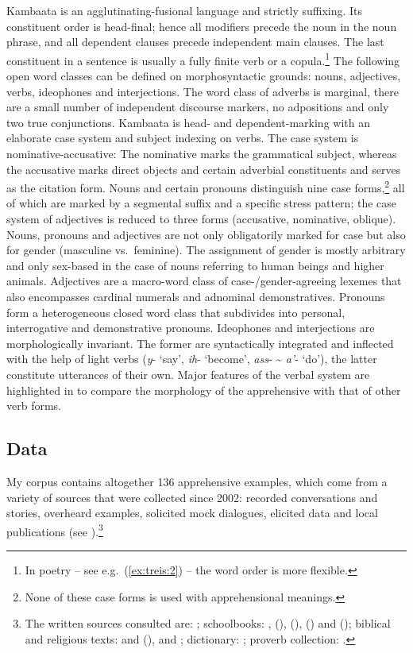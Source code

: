 \documentclass[output=paper,colorlinks,citecolor=brown,
]{langsci/langscibook}
\begin{document}
Kambaata is an agglutinating-fusional language and strictly suffixing. Its constituent order is head-final; hence all modifiers precede the noun in the noun phrase, and all dependent clauses precede independent main clauses. The last constituent in a sentence is usually a fully finite verb or a copula.\footnote{In poetry -- see  e.g.\ (\ref{ex:treis:2}) -- the word order is more flexible.} The following open word classes can be defined on morphosyntactic grounds: nouns, adjectives, verbs, ideophones and interjections. The word class of adverbs is marginal, there are a small number of independent discourse markers, no adpositions and only two true conjunctions. Kambaata is head- and dependent-marking with an elaborate case system and subject indexing on verbs. The case system is nominative-accusative: The nominative marks the grammatical subject, whereas the accusative marks direct objects and certain adverbial constituents and serves as the citation form. Nouns and certain pronouns distinguish nine case forms,\footnote{None of these case forms is used with apprehensional meanings.} all of which are marked by a segmental suffix and a specific stress pattern; the case system of adjectives is reduced to three forms (accusative, nominative, oblique). Nouns, pronouns and adjectives are not only obligatorily marked for case but also for gender (masculine vs.\ feminine). The assignment of gender is mostly arbitrary and only sex-based in the case of nouns referring to human beings and higher animals. Adjectives are a macro-word class of case-\slash gender\hyp agreeing lexemes that also encompasses cardinal numerals and adnominal demonstratives. Pronouns form a heterogeneous closed word class that subdivides into personal, interrogative and demonstrative pronouns. Ideophones and interjections are morphologically invariant. The former are syntactically integrated and inflected with the help of light verbs (\textit{y}- `say', \textit{ih}- `become', \textit{ass}- \~{} \textit{a'}- `do'), the latter constitute utterances of their own. Major features of the verbal system are highlighted in  to compare the morphology of the apprehensive with that of other verb forms.

\subsection{Data}\label{sec:treis:1.3}
\largerpage
My corpus contains altogether 136 apprehensive examples, which come from a variety of sources that were collected since 2002: recorded conversations and stories, overheard examples, solicited mock dialogues, elicited data and local publications (see ).\footnote{The written sources consulted are: \citet{Saint-Exupéry2018}; schoolbooks: \citet[grade 1--8]{KEB1989}, (\citeyear[grade 9--10]{KEB2007}), (\citeyear[grade 1--4]{KEB2008a}), (\citeyear[grade 11]{KEB2008b}) and (\citeyear[grade 12]{KEB2010}); biblical and religious texts: \citet{KHTPH2005} and (\citeyear{KHTPHNodate}), and \citet{BrookYonathan2013}; dictionary: \citet{Alemu2016}; proverb collection: \citet{AlamuAlamaayyo2017}.}   
\clearpage
\end{document}
